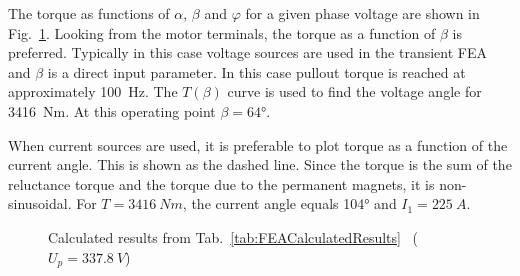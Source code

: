 The torque as functions of $\alpha$, $\beta$ and $\varphi$ for a given phase voltage are shown in Fig.~\ref{fig:heatrun_calulated}. Looking from the motor terminals, the torque as a function of $\beta$ is preferred. Typically in this case voltage sources are used in the transient FEA and $\beta$ is a direct input parameter. In this case pullout torque is reached at approximately \SI{100}{Hz}. The $T(\beta)$ curve is used to find the voltage angle for \SI{3416}{Nm}. At this operating point $\beta=\ang{64}$.

When current sources are used, it is preferable to plot torque as a function of the current angle. This is shown as the dashed line. Since the torque is the sum of the  reluctance torque and the torque due to the permanent magnets, it is non-sinusoidal. For $T=\SI{3416}{Nm}$, the current angle equals \ang{104} and $I_1=\SI{225}{A}$.
\begin{figure}[htbp]
  \centering
    
  \caption{Calculated results from Tab.~\ref{tab:FEACalculatedResults}~%
  ($U_p = \SI{337.8}{V}$)}
  \label{fig:heatrun_calulated}
\end{figure}

